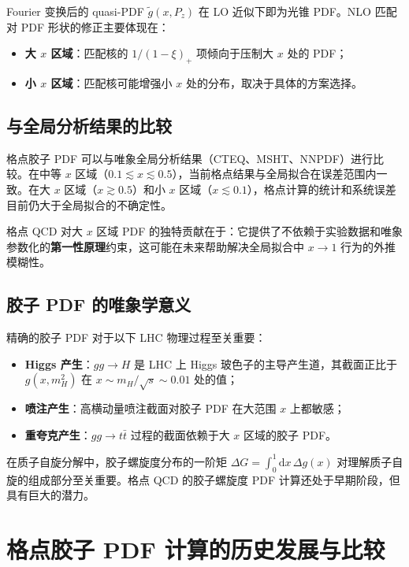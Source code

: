 \documentclass[11pt,a4paper]{ctexart}
\begin{document}
Fourier 变换后的 quasi-PDF $\tilde{g}(x, P_z)$ 在 LO 近似下即为光锥 PDF。NLO 匹配对 PDF 形状的修正主要体现在：
\begin{itemize}
  \item \textbf{大 $x$ 区域}：匹配核的 $1/(1-\xi)_+$ 项倾向于压制大 $x$ 处的 PDF；
  \item \textbf{小 $x$ 区域}：匹配核可能增强小 $x$ 处的分布，取决于具体的方案选择。
\end{itemize}

\subsection{与全局分析结果的比较}

格点胶子 PDF 可以与唯象全局分析结果（CTEQ、MSHT、NNPDF）进行比较。在中等 $x$ 区域（$0.1 \lesssim x \lesssim 0.5$），当前格点结果与全局拟合在误差范围内一致。在大 $x$ 区域（$x \gtrsim 0.5$）和小 $x$ 区域（$x \lesssim 0.1$），格点计算的统计和系统误差目前仍大于全局拟合的不确定性。

格点 QCD 对大 $x$ 区域 PDF 的独特贡献在于：它提供了不依赖于实验数据和唯象参数化的\textbf{第一性原理}约束，这可能在未来帮助解决全局拟合中 $x \to 1$ 行为的外推模糊性。

\subsection{胶子 PDF 的唯象学意义}

精确的胶子 PDF 对于以下 LHC 物理过程至关重要：
\begin{itemize}
  \item \textbf{Higgs 产生}：$gg \to H$ 是 LHC 上 Higgs 玻色子的主导产生道，其截面正比于 $g(x, m_H^2)$ 在 $x \sim m_H/\sqrt{s} \sim 0.01$ 处的值；
  \item \textbf{喷注产生}：高横动量喷注截面对胶子 PDF 在大范围 $x$ 上都敏感；
  \item \textbf{重夸克产生}：$gg \to t\bar{t}$ 过程的截面依赖于大 $x$ 区域的胶子 PDF。
\end{itemize}

在质子自旋分解中，胶子螺旋度分布的一阶矩 $\Delta G = \int_0^1 \mathrm{d}x \, \Delta g(x)$ 对理解质子自旋的组成部分至关重要。格点 QCD 的胶子螺旋度 PDF 计算还处于早期阶段，但具有巨大的潜力。

\section{格点胶子 PDF 计算的历史发展与比较}
\end{document}

